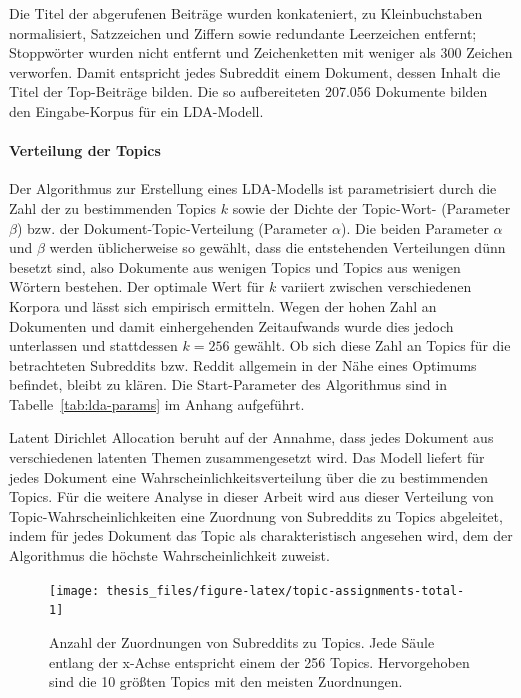 \documentclass[11pt,a4paper,twoside]{article}
\let\oldpar\paragraph
\renewcommand{\paragraph}{\oldpar*}
\begin{document}
Die Titel der abgerufenen Beiträge wurden konkateniert, zu
Kleinbuchstaben normalisiert, Satzzeichen und Ziffern sowie redundante
Leerzeichen entfernt; Stoppwörter wurden nicht entfernt und
Zeichenketten mit weniger als 300 Zeichen verworfen. Damit entspricht
jedes Subreddit einem Dokument, dessen Inhalt die Titel der Top-Beiträge
bilden. Die so aufbereiteten 207.056 Dokumente bilden den Eingabe-Korpus
für ein LDA-Modell.

\hypertarget{topicverteilung}{%
\paragraph{Verteilung der Topics}\label{topicverteilung}}

Der Algorithmus zur Erstellung eines LDA-Modells ist parametrisiert
durch die Zahl der zu bestimmenden Topics \(k\) sowie der Dichte der
Topic-Wort- (Parameter \(\beta\)) bzw. der Dokument-Topic-Verteilung
(Parameter \(\alpha\)). Die beiden Parameter \(\alpha\) und \(\beta\)
werden üblicherweise so gewählt, dass die entstehenden Verteilungen dünn
besetzt sind, also Dokumente aus wenigen Topics und Topics aus wenigen
Wörtern bestehen. Der optimale Wert für \(k\) variiert zwischen
verschiedenen Korpora und lässt sich empirisch ermitteln. Wegen der
hohen Zahl an Dokumenten und damit einhergehenden Zeitaufwands wurde
dies jedoch unterlassen und stattdessen \(k = 256\) gewählt. Ob sich
diese Zahl an Topics für die betrachteten Subreddits bzw. Reddit
allgemein in der Nähe eines Optimums befindet, bleibt zu klären. Die
Start-Parameter des Algorithmus sind in Tabelle~\ref{tab:lda-params} im
Anhang aufgeführt.

Latent Dirichlet Allocation beruht auf der Annahme, dass jedes Dokument
aus verschiedenen latenten Themen zusammengesetzt wird. Das Modell
liefert für jedes Dokument eine Wahrscheinlichkeitsverteilung über die
zu bestimmenden Topics. Für die weitere Analyse in dieser Arbeit wird
aus dieser Verteilung von Topic-Wahrscheinlichkeiten eine Zuordnung von
Subreddits zu Topics abgeleitet, indem für jedes Dokument das Topic als
charakteristisch angesehen wird, dem der Algorithmus die höchste
Wahrscheinlichkeit zuweist.






\begin{figure}

{\centering \texttt{[image: thesis\_files/figure-latex/topic-assignments-total-1]} 

}

\caption{Anzahl der Zuordnungen von Subreddits
zu Topics. Jede Säule entlang der x-Achse entspricht einem der 256
Topics. Hervorgehoben sind die 10 größten Topics mit den meisten
Zuordnungen.}\label{fig:topic-assignments-total}
\end{figure}
\end{document}
